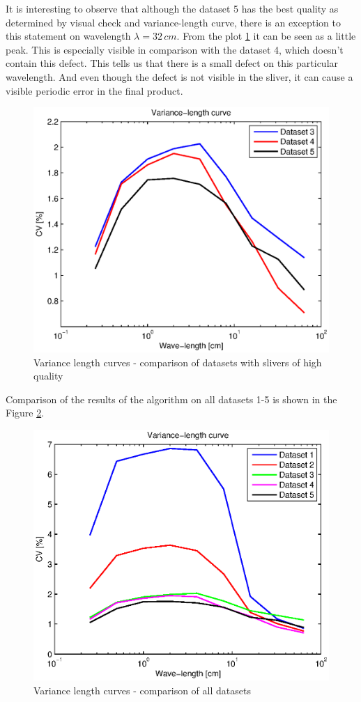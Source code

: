 \documentclass[twoside]{ctuthesis}
\theoremstyle{plain}
\theoremstyle{definition}
\theoremstyle{note}
\begin{document}
It is interesting to observe that although the dataset 5 has the best quality as determined by visual check and variance-length curve, there is an exception to this statement on wavelength $\lambda=32\,cm$. From the plot \ref{fig:VLC_3_4_5} it can be seen as a little peak. This is especially visible in comparison with the dataset 4, which doesn't contain this defect. This tells us that there is a small defect on this particular wavelength. And even though the defect is not visible in the sliver, it can cause a visible periodic error in the final product.
\begin{figure}[h]
	\centering
	\includegraphics[width=1.0\textwidth]{VLC_curves_3_4_5.eps}
	\caption{Variance length curves - comparison of datasets with slivers of high quality}
	\label{fig:VLC_3_4_5}
\end{figure}

Comparison of the results of the algorithm on all datasets 1-5 is shown in the Figure \ref{fig:VLC_all}.
\begin{figure}[h]
	\centering
	\includegraphics[width=1.0\textwidth]{VLC_allCurves.eps}
	\caption{Variance length curves - comparison of all datasets}
	\label{fig:VLC_all}
\end{figure}
\end{document}
